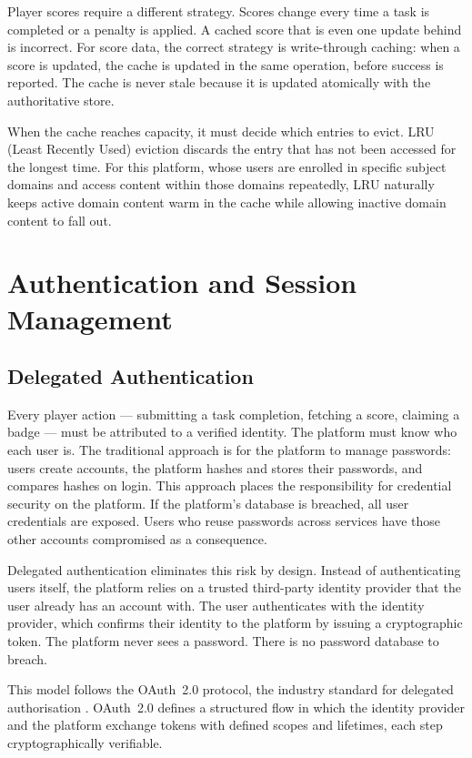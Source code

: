 Player scores require a different strategy. Scores change every time a task is completed or a penalty is applied. A cached score that is even one update behind is incorrect. For score data, the correct strategy is write-through caching: when a score is updated, the cache is updated in the same operation, before success is reported. The cache is never stale because it is updated atomically with the authoritative store.

When the cache reaches capacity, it must decide which entries to evict. LRU (Least Recently Used) eviction discards the entry that has not been accessed for the longest time. For this platform, whose users are enrolled in specific subject domains and access content within those domains repeatedly, LRU naturally keeps active domain content warm in the cache while allowing inactive domain content to fall out.

\section{Authentication and Session Management}

\subsection{Delegated Authentication}

Every player action --- submitting a task completion, fetching a score, claiming a badge --- must be attributed to a verified identity. The platform must know who each user is. The traditional approach is for the platform to manage passwords: users create accounts, the platform hashes and stores their passwords, and compares hashes on login. This approach places the responsibility for credential security on the platform. If the platform's database is breached, all user credentials are exposed. Users who reuse passwords across services have those other accounts compromised as a consequence.

Delegated authentication eliminates this risk by design. Instead of authenticating users itself, the platform relies on a trusted third-party identity provider that the user already has an account with. The user authenticates with the identity provider, which confirms their identity to the platform by issuing a cryptographic token. The platform never sees a password. There is no password database to breach.

This model follows the OAuth~2.0 protocol, the industry standard for delegated authorisation \cite{springboot2024}. OAuth~2.0 defines a structured flow in which the identity provider and the platform exchange tokens with defined scopes and lifetimes, each step cryptographically verifiable.

